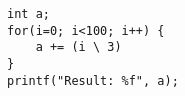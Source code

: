 \documentclass{article}
\begin{document}
\lstset{language=C}

\begin{lstlisting}
int a;
for(i=0; i<100; i++) {
	a += (i \ 3)
}
printf("Result: %f", a);
\end{lstlisting}
\end{document}
